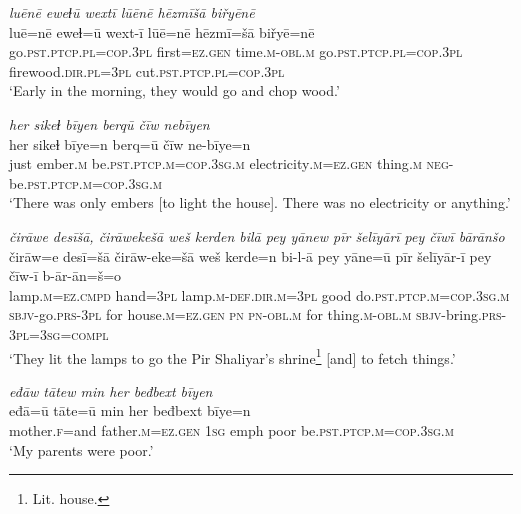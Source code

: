 \ea \label{ŽE.33}
\textit{luēnē eweɫū wextī lūēnē hēzmīšā biřyēnē} \\ 
\gll luē=nē eweɫ=ū wext-ī lūē=nē hēzmī=šā biřyē=nē \\ 
 go\textsc{.pst}\textsc{.ptcp}\textsc{.pl}\textsc{=cop}\textsc{.3pl} first\textsc{\textsc{=ez.gen}} time\textsc{.m}\textsc{-obl}\textsc{.m} go\textsc{.pst}\textsc{.ptcp}\textsc{.pl}\textsc{=cop}\textsc{.3pl} firewood\textsc{.dir}\textsc{.pl}\textsc{=3pl} cut\textsc{.pst}\textsc{.ptcp}\textsc{.pl}\textsc{=cop}\textsc{.3pl} \\ 
\glt `Early in the morning, they would go and chop wood.'
\z 
 
\ea \label{ŽE.40}
\textit{her sikeɫ bīyen berqū čīw nebīyen} \\ 
\gll her sikeɫ bīye=n berq=ū čīw ne-bīye=n \\ 
 just ember\textsc{.m} be\textsc{.pst}\textsc{.ptcp}\textsc{.m}\textsc{=cop}\textsc{.3sg}\textsc{.m} electricity\textsc{.m}\textsc{\textsc{=ez.gen}} thing\textsc{.m} \textsc{neg-}be\textsc{.pst}\textsc{.ptcp}\textsc{.m}\textsc{=cop}\textsc{.3sg}\textsc{.m} \\ 
\glt `There was only embers [to light the house]. There was no electricity or anything.'
\z 
 
\ea \label{ŽE.42}
\textit{čirāwe desīšā, čirāwekešā weš kerden bilā pey yānew pīr šelīyārī pey čīwī bārānšo} \\ 
\gll čirāw=e desī=šā čirāw-eke=šā weš kerde=n bi-l-ā pey yāne=ū pīr šelīyār-ī pey čīw-ī b-ār-ān=š=o \\ 
 lamp\textsc{.m}\textsc{=ez}\textsc{.cmpd} hand\textsc{=3pl} lamp\textsc{.m}\textsc{-def}\textsc{.dir}\textsc{.m}\textsc{=3pl} good do\textsc{.pst}\textsc{.ptcp}\textsc{.m}\textsc{=cop}\textsc{.3sg}\textsc{.m} \textsc{sbjv-}go\textsc{.prs}\textsc{-3pl} for house\textsc{.m}\textsc{\textsc{=ez.gen}} \textsc{pn} \textsc{pn}\textsc{-obl}\textsc{.m} for thing\textsc{.m}\textsc{-obl}\textsc{.m} \textsc{sbjv-}bring\textsc{.prs}\textsc{-3pl}\textsc{=3sg}\textsc{=compl} \\ 
\glt `They lit the lamps to go the Pir Shaliyar’s shrine\footnote{Lit. house.} [and] to fetch things.'
\z 
 
\ea \label{ŽE.43}
\textit{eđāw tātew min her beđbext bīyen} \\ 
\gll eđā=ū tāte=ū min her beđbext bīye=n \\ 
 mother\textsc{.f}=and father\textsc{.m}\textsc{\textsc{=ez.gen}} \textsc{1sg} emph poor be\textsc{.pst}\textsc{.ptcp}\textsc{.m}\textsc{=cop}\textsc{.3sg}\textsc{.m} \\ 
\glt `My parents were poor.'
\z 
 

